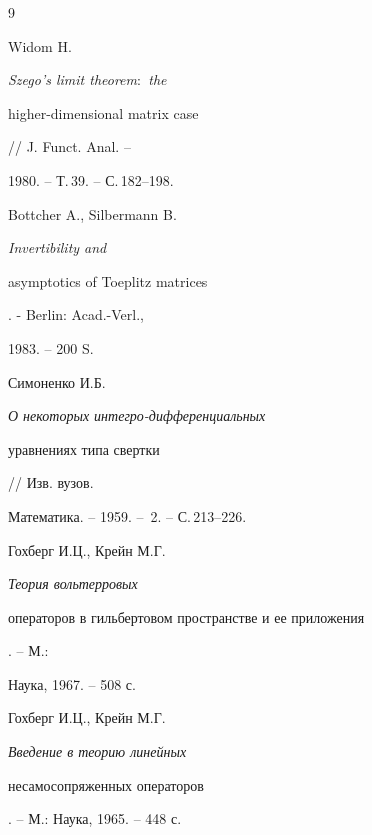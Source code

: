 


\begin{thebibliography}{9} 


 




Widom H. {\em Szego's limit theorem$:$ the 


higher-dimensional matrix case} // J. Funct. Anal. -- 


1980. -- Т.\,39. -- С.\,182--198. 




Bottcher A., Silbermann B. {\em Invertibility and 


asymptotics of Toeplitz matrices}. - Berlin: Acad.-Verl., 


1983. -- 200 S. 




Симоненко И.Б. {\em О некоторых интегро-дифференциальных 


уравнениях типа свертки} // Изв. вузов. 


Математика. -- 1959. -- \No\,2. -- С.\,213--226. 




Гохберг И.Ц., Крейн М.Г. {\em Теория вольтерровых 


операторов в гильбертовом пространстве и ее приложения}. -- М.: 


Наука, 1967. -- 508 с. 




Гохберг И.Ц., Крейн М.Г. {\em Введение в теорию линейных 


несамосопряженных операторов}. -- М.: Наука, 1965. -- 448 с. 


 


\end{thebibliography} 


 


\vskip 2cm 


 






 


\label{end} 


 


